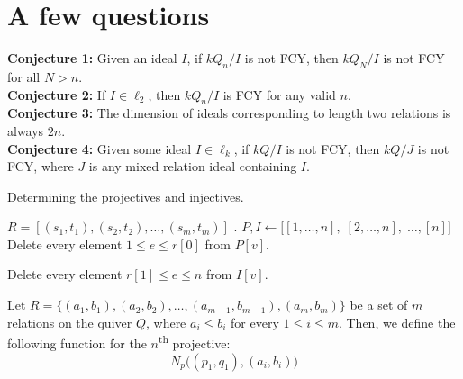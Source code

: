 \documentclass{article}
\begin{document}
\begin{flushleft}
\begin{center}
   \end{center}
   \section{A few questions}
   \textbf{Conjecture 1:} Given an ideal $I$, if $kQ_n/I$ is not FCY, then $kQ_N/I$ is not FCY for all $N > n$. \\
   \textbf{Conjecture 2:} If $I \in \ell_2$, then $kQ_n / I$ is FCY for any valid $n$. \\
   \textbf{Conjecture 3:} The dimension of ideals corresponding to length two relations is always $2n$. \\
   \textbf{Conjecture 4:} Given some ideal $I \in \ell_k$, if $kQ/I$ is not FCY, then $kQ/J$ is not FCY, 
   where $J$ is any mixed relation ideal containing $I$.
\end{flushleft}
\fi

\begin{algorithm}
   \begin{algorithmic}[1]
      \caption{Determining the projectives and injectives.}
      \Require $R = [(s_1, t_1), (s_2, t_2), \ldots, (s_m, t_m)]$ .
      \State $P, I \gets \big[[1, \ldots, n],\; [2, \ldots, n],\; \ldots, [n]\big]$ 
      \State Delete every element $1 \leq e \leq r[0]$ from $P[v]$. 
      \EndFor

      \State Delete every element $r[1] \leq e \leq n$ from $I[v]$. 
      \EndFor
      \EndFor
   \end{algorithmic}
\end{algorithm}
Let $R = \{(a_1,b_1), (a_2,b_2), \ldots, (a_{m-1}, b_{m-1}), (a_m, b_m)\}$ be a set of $m$ relations on the quiver $Q$, 
where $a_i \leq b_i$ for every $1 \leq i \leq m$. Then, we define the following function for the $n$\textsuperscript{th} projective:
\[
   N_p\big((p_1, q_1), (a_i, b_i)\big)
\]
\end{document}
